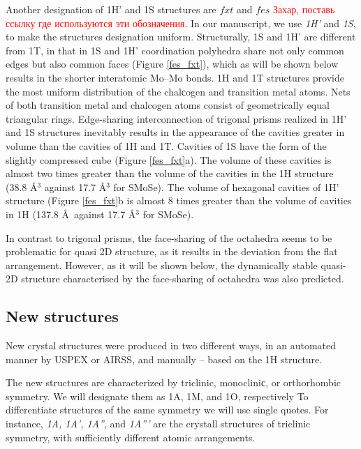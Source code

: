 \documentclass[a4paperm]{article}
\begin{document}
Another designation of 1H' and 1S structures are $fxt$ and $fes$ \cite{}\textcolor{red}{Захар, поставь ссылку где используются эти обозначения}.
In our manuscript, we use {\it 1H'} and {\it 1S}, to make the structures designation uniform.
Structurally, 1S and 1H' are different from 1T, in that in 1S and 1H' coordination polyhedra share not only common edges but also common faces (Figure \ref{fes_fxt}), which as will be shown below results in the shorter interatomic Mo--Mo bonds.
1H and 1T structures provide the most uniform distribution of the chalсogen and transition metal atoms.
Nets of both transition metal and chalcogen atoms consist of  geometrically equal triangular rings.
Edge-sharing interconnection of trigonal prisms realized in 1H' and 1S structures inevitably results in the appearance of the cavities greater in volume than the cavities of 1H and 1T. 
Cavities of 1S have the form of the slightly compressed cube (Figure \ref{fes_fxt}a).
The volume of these cavities is almost two times greater than the volume of the cavities in the 1H structure (38.8 \AA$^3$ against 17.7 \AA$^3$ for SMoSe).
The volume of hexagonal cavities of 1H' structure (Figure \ref{fes_fxt}b is almost 8 times greater than the volume of cavities in 1H (137.8 \AA\ against 17.7 \AA$^3$ for SMoSe).

In contrast to trigonal prisms, the face-sharing of the octahedra seems to be problematic for quasi 2D structure, as it results in the deviation from the flat arrangement.
However, as it will be shown below, the dynamically stable quasi-2D structure characterised by the face-sharing of octahedra was also predicted.



		\subsection{New structures}

New crystal structures were produced in two different ways, in an automated manner by USPEX or AIRSS, and manually -- based on the 1H structure.

The new structures are characterized by triclinic, monocliniс, or orthorhombic symmetry.
We will designate them as 1A, 1M, and 1O, respectively
To differentiate structures of the same symmetry we will use single quotes.
For instance, {\it 1A, 1A', 1A''}, and {\it 1A'''} are the crystall structures of triclinic symmetry, with sufficiently different atomic arrangements.
\end{document}
